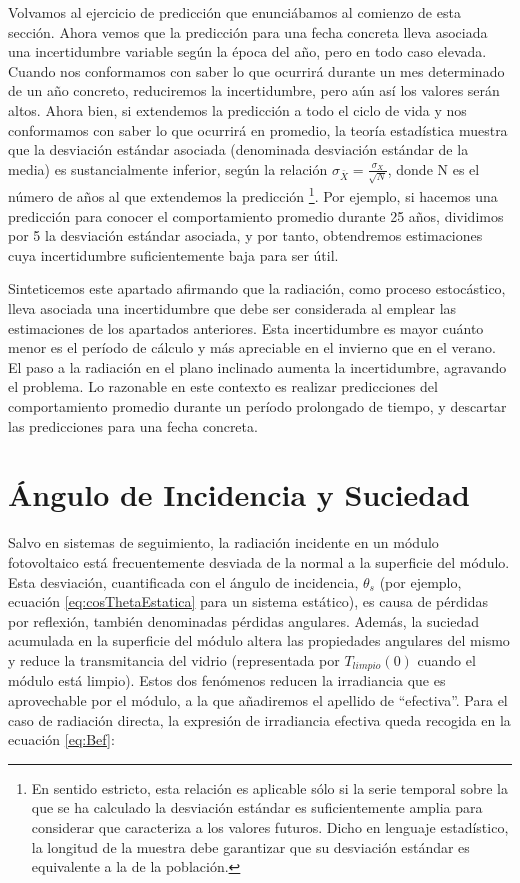 Volvamos al ejercicio de predicción que enunciábamos al comienzo de
esta sección. Ahora vemos que la predicción para una fecha concreta
lleva asociada una incertidumbre variable según la época del año,
pero en todo caso elevada. Cuando nos conformamos con saber lo que
ocurrirá durante un mes determinado de un año concreto, reduciremos
la incertidumbre, pero aún así los valores serán altos. Ahora bien,
si extendemos la predicción a todo el ciclo de vida y nos conformamos
con saber lo que ocurrirá en promedio, la teoría estadística muestra
que la desviación estándar asociada (denominada desviación estándar
de la media) es sustancialmente inferior, según la relación $\sigma_{\bar{X}}=\frac{\sigma_{X}}{\sqrt{N}}$,
donde N es el número de años al que extendemos la predicción%
\footnote{En sentido estricto, esta relación es aplicable sólo si la serie temporal
sobre la que se ha calculado la desviación estándar es suficientemente
amplia para considerar que caracteriza a los valores futuros. Dicho
en lenguaje estadístico, la longitud de la muestra debe garantizar
que su desviación estándar es equivalente a la de la población.%
}. Por ejemplo, si hacemos una predicción para conocer el comportamiento
promedio durante 25 años, dividimos por 5 la desviación estándar asociada,
y por tanto, obtendremos estimaciones cuya incertidumbre suficientemente
baja para ser útil. 

Sinteticemos este apartado afirmando que la radiación, como proceso
estocástico, lleva asociada una incertidumbre que debe ser considerada
al emplear las estimaciones de los apartados anteriores. Esta incertidumbre
es mayor cuánto menor es el período de cálculo y más apreciable en
el invierno que en el verano. El paso a la radiación en el plano inclinado
aumenta la incertidumbre, agravando el problema. Lo razonable en este
contexto es realizar predicciones del comportamiento promedio durante
un período prolongado de tiempo, y descartar las predicciones para
una fecha concreta.


\section{Ángulo de Incidencia y Suciedad\label{sec:RadiacionEfectiva}}

Salvo en sistemas de seguimiento, la radiación incidente en un módulo
fotovoltaico está frecuentemente desviada de la normal a la superficie
del módulo. Esta desviación, cuantificada con el ángulo de incidencia,
$\theta_{s}$ (por ejemplo, ecuación \ref{eq:cosThetaEstatica} para
un sistema estático), es causa de pérdidas por reflexión, también
denominadas pérdidas angulares. Además, la suciedad acumulada en la
superficie del módulo altera las propiedades angulares del mismo y
reduce la transmitancia del vidrio (representada por $T_{limpio}(0)$
cuando el módulo está limpio). Estos dos fenómenos reducen la irradiancia
que es aprovechable por el módulo, a la que añadiremos el apellido
de {}``efectiva''. Para el caso de radiación directa, la expresión
de irradiancia efectiva queda recogida en la ecuación \ref{eq:Bef}:


